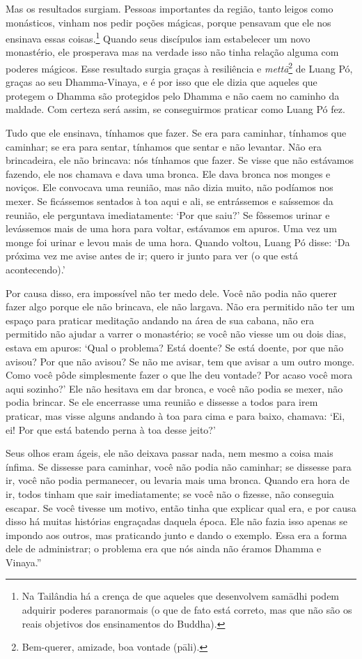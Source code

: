 Mas os resultados surgiam. Pessoas importantes da região, tanto leigos
como monásticos, vinham nos pedir poções mágicas, porque pensavam que
ele nos ensinava essas coisas.\footnote{Na Tailândia há a crença de que
  aqueles que desenvolvem samādhi podem adquirir poderes paranormais (o
  que de fato está correto, mas que não são os reais objetivos dos
  ensinamentos do Buddha).} Quando seus discípulos iam estabelecer um
novo monastério, ele prosperava mas na verdade isso não tinha relação
alguma com poderes mágicos. Esse resultado surgia graças à resiliência e
\emph{mettā}\footnote{Bem-querer, amizade, boa vontade (pāli).} de Luang
Pó, graças ao seu Dhamma-Vinaya, e é por isso que ele dizia que aqueles
que protegem o Dhamma são protegidos pelo Dhamma e não caem no caminho
da maldade. Com certeza será assim, se conseguirmos praticar como Luang
Pó fez.

Tudo que ele ensinava, tínhamos que fazer. Se era para caminhar,
tínhamos que caminhar; se era para sentar, tínhamos que sentar e não
levantar. Não era brincadeira, ele não brincava: nós tínhamos que fazer.
Se visse que não estávamos fazendo, ele nos chamava e dava uma bronca.
Ele dava bronca nos monges e noviços. Ele convocava uma reunião, mas não
dizia muito, não podíamos nos mexer. Se ficássemos sentados à toa aqui e
ali, se entrássemos e saíssemos da reunião, ele perguntava
imediatamente: `Por que saiu?' Se fôssemos urinar e levássemos mais de
uma hora para voltar, estávamos em apuros. Uma vez um monge foi urinar e
levou mais de uma hora. Quando voltou, Luang Pó disse: `Da próxima vez
me avise antes de ir; quero ir junto para ver (o que está acontecendo).'

Por causa disso, era impossível não ter medo dele. Você não podia não
querer fazer algo porque ele não brincava, ele não largava. Não era
permitido não ter um espaço para praticar meditação andando na área de
sua cabana, não era permitido não ajudar a varrer o monastério; se você
não viesse um ou dois dias, estava em apuros: `Qual o problema? Está
doente? Se está doente, por que não avisou? Por que não avisou? Se não
me avisar, tem que avisar a um outro monge. Como você pôde simplesmente
fazer o que lhe deu vontade? Por acaso você mora aqui sozinho?' Ele não
hesitava em dar bronca, e você não podia se mexer, não podia brincar. Se
ele encerrasse uma reunião e dissesse a todos para irem praticar, mas
visse alguns andando à toa para cima e para baixo, chamava: `Ei, ei! Por
que está batendo perna à toa desse jeito?'

Seus olhos eram ágeis, ele não deixava passar nada, nem mesmo a coisa
mais ínfima. Se dissesse para caminhar, você não podia não caminhar; se
dissesse para ir, você não podia permanecer, ou levaria mais uma bronca.
Quando era hora de ir, todos tinham que sair imediatamente; se você não
o fizesse, não conseguia escapar. Se você tivesse um motivo, então tinha
que explicar qual era, e por causa disso há muitas histórias engraçadas
daquela época. Ele não fazia isso apenas se impondo aos outros, mas
praticando junto e dando o exemplo. Essa era a forma dele de
administrar; o problema era que nós ainda não éramos Dhamma e Vinaya.''

